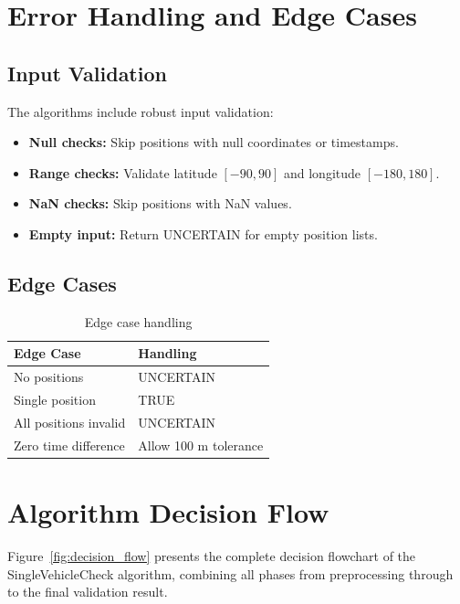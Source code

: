 \section{Error Handling and Edge Cases}

\subsection{Input Validation}
The algorithms include robust input validation:
\begin{itemize}
    \item \textbf{Null checks:} Skip positions with null coordinates or timestamps.
    \item \textbf{Range checks:} Validate latitude $[-90, 90]$ and longitude $[-180, 180]$.
    \item \textbf{NaN checks:} Skip positions with NaN values.
    \item \textbf{Empty input:} Return UNCERTAIN for empty position lists.
\end{itemize}

\subsection{Edge Cases}

\begin{table}[h]
\centering
\caption{Edge case handling}
\label{tab:edge_cases}
\begin{tabular}{|p{32mm}|p{42mm}|}
\hline
\textbf{Edge Case} & \textbf{Handling} \\
\hline
No positions & UNCERTAIN \\
\hline
Single position & TRUE \\
\hline
All positions invalid & UNCERTAIN \\
\hline
Zero time difference & Allow 100 m tolerance \\
\hline
\end{tabular}
\end{table}

\clearpage
\section{Algorithm Decision Flow}

Figure~\ref{fig:decision_flow} presents the complete decision flowchart of the SingleVehicleCheck algorithm, combining all phases from preprocessing through to the final validation result.

